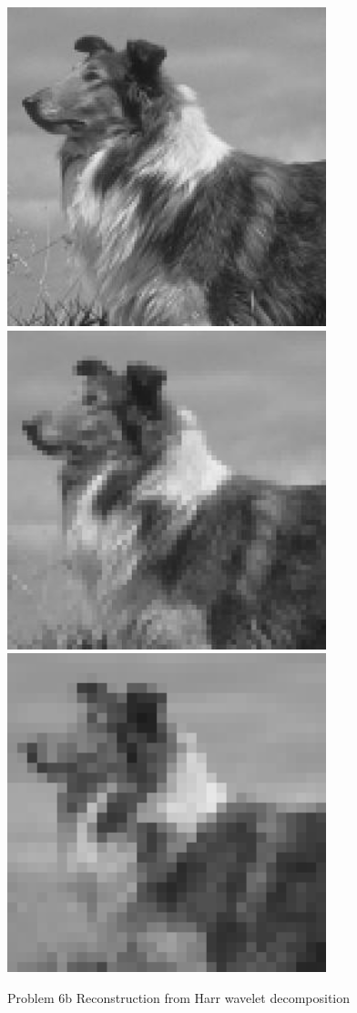 \documentclass{article}
\begin{document}
\begin{figure}[!h]
  \centering
    \includegraphics[height=25em]{code/outputs/prob6b_0.jpg}
    \includegraphics[height=25em]{code/outputs/prob6b_1.jpg}
    \includegraphics[height=25em]{code/outputs/prob6b_2.jpg}
  \caption{Problem 6b Reconstruction from Harr wavelet decomposition}
  \label{fig:output6b}
\end{figure}
\end{document}
